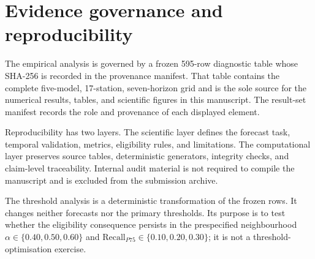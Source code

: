 \section{Evidence governance and reproducibility}
\label{sec:workflow}

The empirical analysis is governed by a frozen 595-row diagnostic table
whose SHA-256 is recorded in the provenance manifest. That table contains
the complete five-model, 17-station, seven-horizon grid and is the sole
source for the numerical results, tables, and scientific figures in this
manuscript. The result-set manifest records the role and provenance of each
displayed element.

Reproducibility has two layers. The scientific layer defines the forecast
task, temporal validation, metrics, eligibility rules, and limitations. The
computational layer preserves source tables, deterministic generators,
integrity checks, and claim-level traceability. Internal audit material is
not required to compile the manuscript and is excluded from the submission
archive.

The threshold analysis is a deterministic transformation of the frozen
rows. It changes neither forecasts nor the primary thresholds. Its purpose
is to test whether the eligibility consequence persists in the prespecified
neighbourhood $\alpha\in\{0.40,0.50,0.60\}$ and
$\mathrm{Recall}_{P75}\in\{0.10,0.20,0.30\}$; it is not a threshold-optimisation
exercise.
